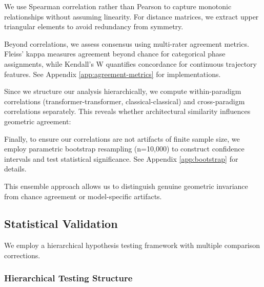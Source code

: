 \documentclass[11pt,letterpaper]{article}
\begin{document}
We use Spearman correlation rather than Pearson to capture monotonic relationships without assuming linearity. For distance matrices, we extract upper triangular elements to avoid redundancy from symmetry.

Beyond correlations, we assess consensus using multi-rater agreement metrics. Fleiss' kappa measures agreement beyond chance for categorical phase assignments, while Kendall's W quantifies concordance for continuous trajectory features. See Appendix \ref{app:agreement-metrics} for implementations.

Since we structure our analysis hierarchically, we compute within-paradigm correlations (transformer-transformer, classical-classical) and cross-paradigm correlations separately. This reveals whether architectural similarity influences geometric agreement:


Finally, to ensure our correlations are not artifacts of finite sample size, we employ parametric bootstrap resampling (n=10,000) to construct confidence intervals and test statistical significance. See Appendix \ref{app:bootstrap} for details.

This ensemble approach allows us to distinguish genuine geometric invariance from chance agreement or model-specific artifacts.

\subsection{Statistical Validation}

We employ a hierarchical hypothesis testing framework with multiple comparison corrections.

\subsubsection{Hierarchical Testing Structure}
\end{document}

